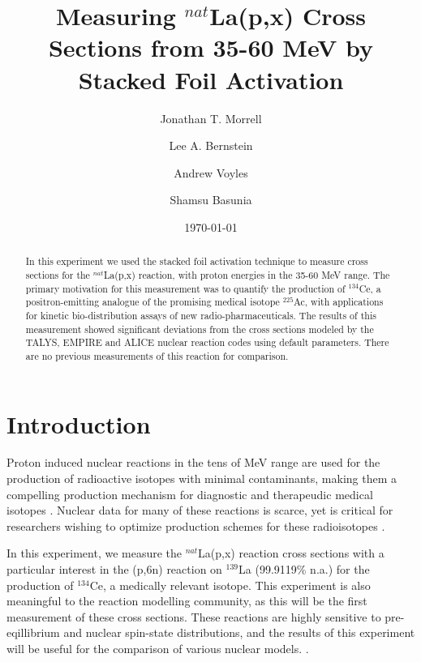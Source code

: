 \documentclass[aps,superscriptaddress,twocolumn,secnumarabic,balancelastpage,amsmath,amssymb,nofootinbib,floatfix]{revtex4-1}
\begin{document}
\title{Measuring $^{nat}$La(p,x) Cross Sections from 35-60 MeV by Stacked Foil Activation}
\author{Jonathan T. Morrell}
\author{Lee A. Bernstein}
\author{Andrew Voyles}
\author{Shamsu Basunia}
\date{\today}
\setlength{\parskip}{1em}

\begin{abstract}
In this experiment we used the stacked foil activation technique to measure cross sections for the $^{nat}$La(p,x) reaction, with proton energies in the 35-60 MeV range.  The primary motivation for this measurement was to quantify the production of $^{134}$Ce, a positron-emitting analogue of the promising medical isotope $^{225}$Ac, with applications for kinetic bio-distribution assays of new radio-pharmaceuticals.  The results of this measurement showed significant deviations from the cross sections modeled by the TALYS, EMPIRE and ALICE nuclear reaction codes using default parameters.  There are no previous measurements of this reaction for comparison.
\end{abstract}

\maketitle


\section{Introduction}
Proton induced nuclear reactions in the tens of MeV range are used for the production of radioactive isotopes with minimal contaminants, making them a compelling production mechanism for diagnostic and therapeudic medical isotopes \cite{TARKANYI2016262}.  Nuclear data for many of these reactions is scarce, yet is critical for researchers wishing to optimize production schemes for these radioisotopes \cite{nuclear_data_needs}.

In this experiment, we measure the $^{nat}$La(p,x) reaction cross sections with a particular interest in the (p,6n) reaction on $^{139}$La (99.9119\% n.a.) for the production of $^{134}$Ce, a medically relevant isotope.  This experiment is also meaningful to the reaction modelling community, as this will be the first measurement of these cross sections.  These reactions are highly sensitive to pre-eqillibrium and nuclear spin-state distributions, and the results of this experiment will be useful for the comparison of various nuclear models. \cite{OTUKA2014272, PhysRev.87.366, nuclear_data_needs}.
\end{document}
